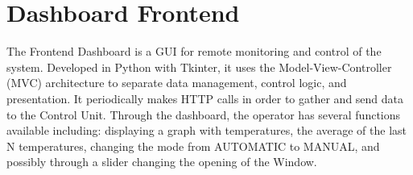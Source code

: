 \documentclass[a4paper]{article}
\begin{document}
	\section{Dashboard Frontend}
	The Frontend Dashboard is a GUI for remote monitoring and control of the system. Developed in Python with Tkinter, it uses the Model-View-Controller (MVC) architecture to separate data management, control logic, and presentation. It periodically makes HTTP calls in order to gather and send data to the Control Unit. Through the dashboard, the operator has several functions available including: displaying a graph with temperatures, the average of the last N temperatures, changing the mode from AUTOMATIC to MANUAL, and possibly through a slider changing the opening of the Window.
	
	
\end{document}
